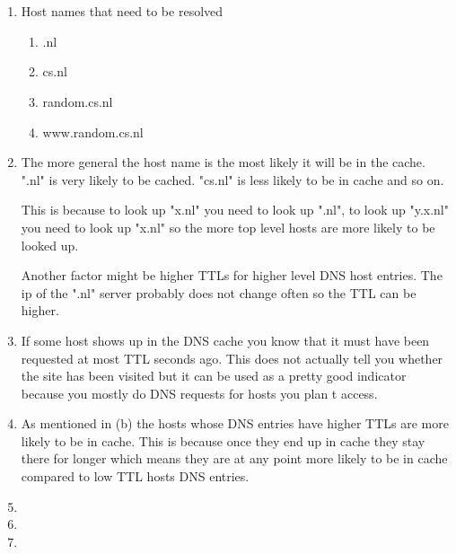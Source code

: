 \documentclass[12pt, a4paper]{article}
\begin{document}
\section{} %
\begin{enumerate}[a]
	\item %
	Host names that need to be resolved
	\begin{enumerate}
		\item .nl
		\item cs.nl
		\item random.cs.nl
		\item www.random.cs.nl
	\end{enumerate}

	\item %
	The more general the host name is the most likely it will be in the cache. ".nl" is very likely to be cached. "cs.nl" is less likely to be in cache and so on.

	This is because to look up "x.nl" you need to look up ".nl", to look up "y.x.nl" you need to look up "x.nl" so the more top level hosts are more likely to be looked up.

	Another factor might be higher TTLs for higher level DNS host entries. The ip of the ".nl" server probably does not change often so the TTL can be higher.

	\item %
	If some host shows up in the DNS cache you know that it must have been requested at most TTL seconds ago. This does not actually tell you whether the site has been visited but it can be used as a pretty good indicator because you mostly do DNS requests for hosts you plan t access.

	\item %
	As mentioned in (b) the hosts whose DNS entries have higher TTLs are more likely to be in cache. This is because once they end up in cache they stay there for longer which means they are at any point more likely to be in cache compared to low TTL hosts DNS entries.

	\item %
	\item %
	\item %
\end{enumerate}

\section{} %

\section{} %
\end{document}
